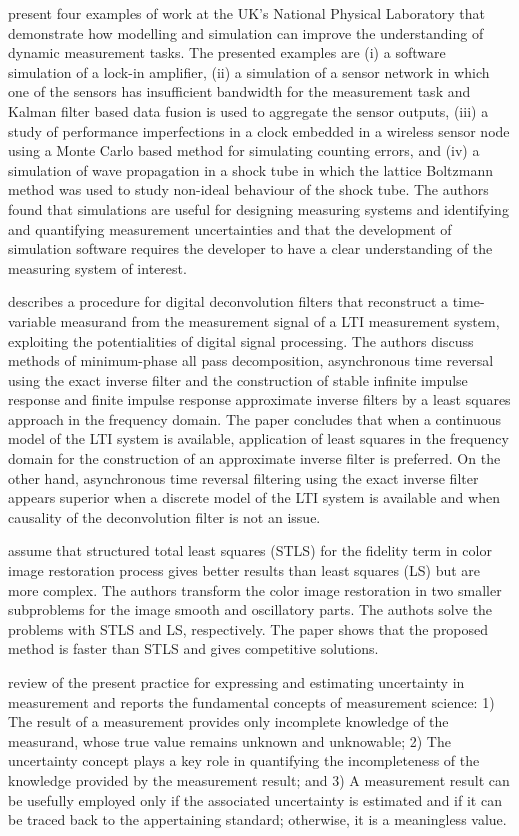 \documentclass[11pt]{article}
\begin{document}
\citet{Esward16} present four examples of work at the UK's National Physical Laboratory that demonstrate how modelling and simulation can improve the understanding of dynamic measurement tasks. The presented examples are (i) a software simulation of a lock-in amplifier, (ii) a simulation of a sensor network in which one of the sensors has insufficient bandwidth for the measurement task and Kalman filter based data fusion is used to aggregate the sensor outputs, (iii) a study of performance imperfections in a clock embedded in a wireless sensor node using a Monte Carlo based method for simulating counting errors, and (iv) a simulation of wave propagation in a shock tube in which the lattice Boltzmann method was used to study non-ideal behaviour of the shock tube. The authors found that simulations are useful for designing measuring systems and identifying and quantifying measurement uncertainties and that the development of simulation software requires the developer to have a clear understanding of the measuring system of interest.

\citet{Eichstadt10} describes a procedure for digital deconvolution filters that reconstruct a time-variable measurand from the measurement signal of a LTI measurement system, exploiting the potentialities of digital signal processing. The authors discuss methods of minimum-phase all pass decomposition, asynchronous time reversal using the exact inverse filter and the construction of stable infinite impulse response and finite impulse response approximate inverse filters by a least squares approach in the frequency domain. The paper concludes that when a continuous model of the LTI system is available, application of least squares in the frequency domain for the construction of an approximate inverse filter is preferred. On the other hand, asynchronous time reversal filtering using the exact inverse filter appears superior when a discrete model of the LTI system is available and when causality of the deconvolution filter is not an issue.

\citet{Feiz17} assume that structured total least squares (STLS) for the fidelity term in color image restoration process gives better results than least squares (LS) but are more complex. The authors transform the color image restoration in two smaller subproblems for the image smooth and oscillatory parts. The authots solve the problems with STLS and LS, respectively. The paper shows that the proposed method is faster than STLS and gives competitive solutions. 

\citet{Ferrero06} review of the present practice for expressing and estimating uncertainty in measurement and reports the  fundamental concepts of measurement science: 1) The result of a measurement provides only incomplete knowledge of the measurand, whose true value remains unknown and unknowable; 2) The uncertainty concept plays a key role in quantifying the incompleteness of the knowledge provided by the measurement result; and 3) A measurement result can be usefully employed only if the associated uncertainty is estimated and if it can be traced back to the appertaining standard; otherwise, it is a meaningless value.
\end{document}
